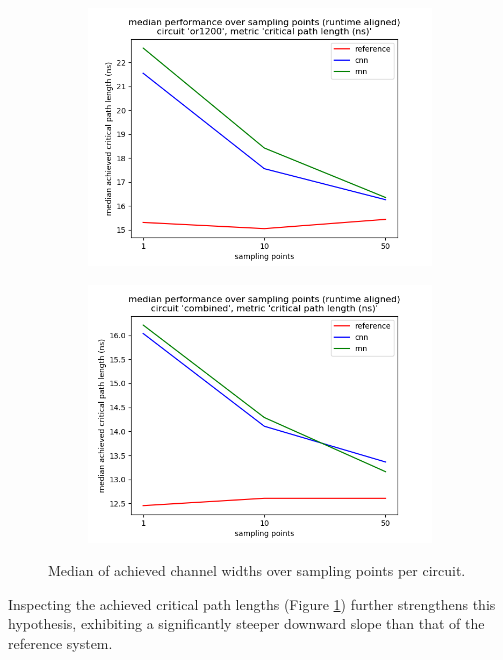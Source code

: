 \begin{figure}
\begin{subfigure}[b]{0.45\linewidth}
	\end{subfigure}
	\begin{subfigure}[b]{0.45\linewidth}
		\includegraphics[width=\linewidth]{plots/eval-or1200-critical-path-median.png}
	\end{subfigure}
	\begin{subfigure}[b]{0.45\linewidth}
		\includegraphics[width=\linewidth]{plots/eval-combined-critical-path-median.png}
	\end{subfigure}
	\caption{Median of achieved channel widths over sampling points per circuit.}
	\label{fig:eval-critical-path-median}
\end{figure}

Inspecting the achieved critical path lengths (Figure \ref{fig:eval-critical-path-median}) further strengthens this hypothesis, exhibiting a significantly steeper downward slope than that of the reference system.

